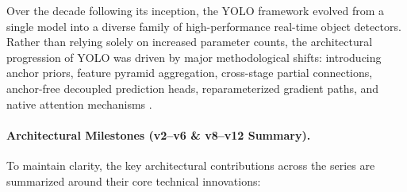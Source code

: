 Over the decade following its inception, the YOLO framework evolved from a single model into a diverse family of high-performance real-time object detectors. Rather than relying solely on increased parameter counts, the architectural progression of YOLO was driven by major methodological shifts: introducing anchor priors, feature pyramid aggregation, cross-stage partial connections, anchor-free decoupled prediction heads, reparameterized gradient paths, and native attention mechanisms \parencite{ramos_yoloreview}.

\paragraph{Architectural Milestones (v2--v6 \& v8--v12 Summary).}
To maintain clarity, the key architectural contributions across the series are summarized around their core technical innovations:

